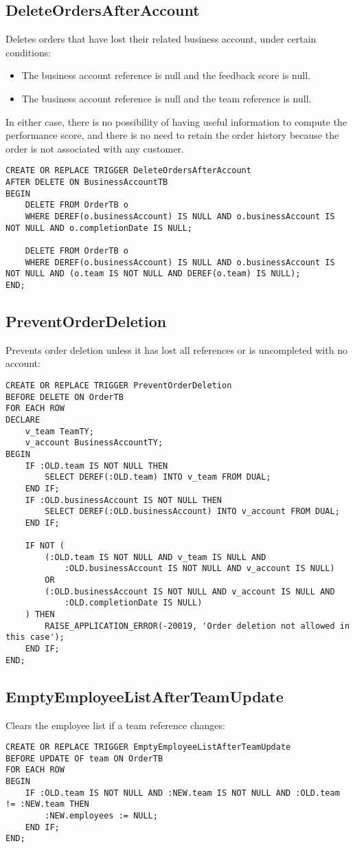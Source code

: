 \subsection*{DeleteOrdersAfterAccount}
Deletes orders that have lost their related business account, under certain conditions:
\begin{itemize}[label=-]
    \item The business account reference is null and the feedback score is null.
    \item The business account reference is null and the team reference is null.
\end{itemize}
In either case, there is no possibility of having useful information to compute the performance score, and there is no need to retain the order history because the order is not associated with any customer.
\begin{lstlisting}
CREATE OR REPLACE TRIGGER DeleteOrdersAfterAccount
AFTER DELETE ON BusinessAccountTB
BEGIN
    DELETE FROM OrderTB o
    WHERE DEREF(o.businessAccount) IS NULL AND o.businessAccount IS NOT NULL AND o.completionDate IS NULL;

    DELETE FROM OrderTB o
    WHERE DEREF(o.businessAccount) IS NULL AND o.businessAccount IS NOT NULL AND (o.team IS NOT NULL AND DEREF(o.team) IS NULL);
END;
\end{lstlisting}

\subsection*{PreventOrderDeletion}
Prevents order deletion unless it has lost all references or is uncompleted with no account:
\begin{lstlisting}
CREATE OR REPLACE TRIGGER PreventOrderDeletion
BEFORE DELETE ON OrderTB
FOR EACH ROW
DECLARE
    v_team TeamTY;
    v_account BusinessAccountTY;
BEGIN
    IF :OLD.team IS NOT NULL THEN
        SELECT DEREF(:OLD.team) INTO v_team FROM DUAL;
    END IF;
    IF :OLD.businessAccount IS NOT NULL THEN
        SELECT DEREF(:OLD.businessAccount) INTO v_account FROM DUAL;
    END IF;

    IF NOT (
        (:OLD.team IS NOT NULL AND v_team IS NULL AND 
            :OLD.businessAccount IS NOT NULL AND v_account IS NULL)
        OR
        (:OLD.businessAccount IS NOT NULL AND v_account IS NULL AND 
            :OLD.completionDate IS NULL)
    ) THEN
        RAISE_APPLICATION_ERROR(-20019, 'Order deletion not allowed in this case');
    END IF;
END;
\end{lstlisting}

\subsection*{EmptyEmployeeListAfterTeamUpdate}
Clears the employee list if a team reference changes:
\begin{lstlisting}
CREATE OR REPLACE TRIGGER EmptyEmployeeListAfterTeamUpdate
BEFORE UPDATE OF team ON OrderTB
FOR EACH ROW
BEGIN
    IF :OLD.team IS NOT NULL AND :NEW.team IS NOT NULL AND :OLD.team != :NEW.team THEN
        :NEW.employees := NULL;
    END IF;
END;
\end{lstlisting}
